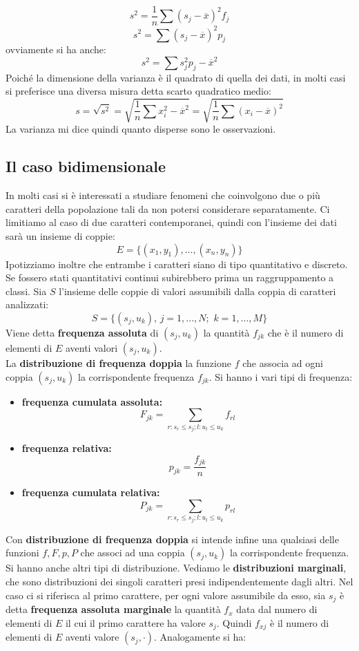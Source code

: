 \documentclass[a4paper,12pt, oneside]{book}
\begin{document}
$$s^2=\frac{1}{n}\sum (s_j-\overline{x})^2f_j$$
$$s^2=\sum (s_j-\overline{x})^2p_j$$
ovviamente si ha anche:
$$s^2=\sum s_j^2p_j-\overline{x}^2$$
Poiché la dimensione della varianza è il quadrato di quella dei dati, in molti casi
si preferisce una diversa misura detta scarto quadratico medio:
$$s=\sqrt{s^2}=\sqrt{\frac{1}{n}\sum x_i^2-\overline{x}^2}=\sqrt{\frac{1}{n}\sum (x_i-\overline{x})^2}$$
La varianza mi dice quindi quanto disperse sono le osservazioni.
\subsection{Il caso bidimensionale}
In molti casi si è interessati a studiare fenomeni che coinvolgono due o più caratteri della popolazione tali da non potersi considerare separatamente. Ci limitiamo al caso di due caratteri contemporanei, quindi con l'insieme dei dati sarà un insieme di coppie:
$$E=\{(x_1,y_1),...,(x_n,y_n)\}$$
Ipotizziamo inoltre che entrambe i caratteri siano di tipo quantitativo e discreto. Se fossero stati quantitativi continui subirebbero prima un raggruppamento a classi. Sia $S$ l'insieme delle coppie di valori assumibili dalla coppia di caratteri analizzati:
$$S=\{(s_j,u_k),\,j=1,...,N;\,\,k=1,...,M\}$$
Viene detta \textbf{frequenza assoluta} di $(s_j,u_k)$ la quantità $f_{jk}$ che è il numero di elementi di $E$ aventi valori $(s_j,u_k)$.\\ La \textbf{distribuzione di frequenza doppia} la funzione $f$ che associa ad ogni coppia $(s_j,u_k)$ la corrispondente frequenza $f_{jk}$.
\newpage
 Si hanno i vari tipi di frequenza:
\begin{itemize}
\item \textbf{frequenza cumulata assoluta:}
$$F_{jk}=\sum_{r:s_r\leq s_j;l:u_l\leq u_k}f_{rl}$$
\item \textbf{frequenza relativa:}
$$p_{jk}=\frac{f_{jk}}{n}$$
\item \textbf{frequenza cumulata relativa:}
$$P_{jk}=\sum_{r:s_r\leq s_j;l:u_l\leq u_k}p_{rl}$$
\end{itemize}
Con \textbf{distribuzione di frequenza doppia} si intende infine una qualsiasi delle funzioni $f,F,p,P$ che associ ad una coppia $(s_j,u_k)$ la corrispondente frequenza.\\
Si hanno anche altri tipi di distribuzione. Vediamo le \textbf{distribuzioni marginali}, che sono distribuzioni dei singoli caratteri presi indipendentemente dagli altri. Nel caso ci si riferisca al primo carattere, per ogni valore assumibile da esso, sia $s_j$ è detta \textbf{frequenza assoluta marginale} la quantità $f_x$ data dal numero di elementi di $E$ il cui il primo carattere ha valore $s_j$. Quindi $f_{xj}$ è il numero di elementi di $E$ aventi valore $(s_j,\cdot)$. Analogamente si ha:
\end{document}
